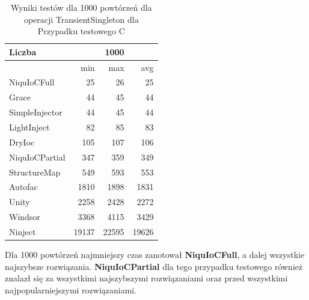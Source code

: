 \documentclass[12pt]{article}
\begin{document}
\begin{table}[H]
\captionsetup{belowskip=0pt,aboveskip=0pt}
\begin{center}
\begin{small}
	\begin{tabular}{ | l | r r r | }
    		\hline
Liczba & & 1000 & \\ \hline
 & min & max & avg \\ \hline
NiquIoCFull & 25 & 26 & 25 \\ \hline
Grace & 44 & 45 & 44 \\ \hline
SimpleInjector & 44 & 45 & 44 \\ \hline
LightInject & 82 & 85 & 83 \\ \hline
DryIoc & 105 & 107 & 106 \\ \hline
NiquIoCPartial & 347 & 359 & 349 \\ \hline
StructureMap & 549 & 593 & 553 \\ \hline
Autofac & 1810 & 1898 & 1831 \\ \hline
Unity & 2258 & 2428 & 2272 \\ \hline
Windsor & 3368 & 4115 & 3429 \\ \hline
Ninject & 19137 & 22595 & 19626 \\ \hline
  	\end{tabular}
\end{small}
\end{center}
\caption{Wyniki testów dla 1000 powtórzeń dla operacji TransientSingleton dla Przypadku testowego C}
\label{TestCaseC_TransientSingleton1000}
\end{table}
Dla 1000 powtórzeń najmniejszy czas zanotował \textbf{NiquIoCFull}, a dalej wszystkie najszybsze rozwiązania. \textbf{NiquIoCPartial} dla tego przypadku testowego również znalazł się za wszystkimi najszybszymi rozwiązaniami oraz przed wszystkimi najpopularniejszymi rozwiązaniami.
\end{document}
